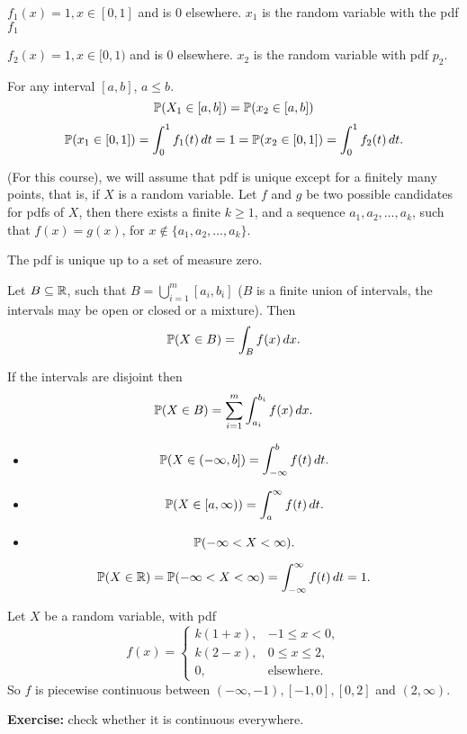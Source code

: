 \documentclass[10pt, a4paper]{article}
\begin{document}
\begin{example}
    $f_1(x) = 1, x \in [0, 1]$ and is $0$ elsewhere.
    $x_1$ is the random variable with the pdf $f_1$
    
    $f_2(x) = 1, x \in [0, 1)$ and is $0$ elsewhere.
    $x_2$ is the random variable with pdf $p_2$.

    For any interval $[a, b]$, $a \leq b$.
    \[
    \P(X_1 \in [a, b]) = \P(x_2 \in [a, b])
    \]
    \[
    \P(x_1 \in [0, 1]) = \int_0^1f_1(t)\,dt = 1 = \P(x_2 \in [0, 1]) = \int_0^1f_2(t)\,dt.
    \]

    (For this course),
    we will assume that pdf is unique except for a finitely many points,
    that is,
    if $X$ is a random variable.
    Let $f$ and $g$ be two possible candidates for pdfs of $X$,
    then there exists a finite $k \geq 1$,
    and a sequence $a_1, a_2, \dotsc, a_k$,
    such that $f(x) = g(x)$,
    for $x \notin \{a_1, a_2, \dotsc, a_k\}$.

    The pdf is unique up to a set of measure zero.
\end{example}

\begin{theorem}\label{prob_thm_622}
    Let $B \subseteq \R$,
    such that $\displaystyle B = \bigcup_{i = 1}^{m}[a_i, b_i]$
    ($B$ is a finite union of intervals,
    the intervals may be open or closed or a mixture).
    Then
    \[
    \P(X \in B) = \int_Bf(x)\,dx.
    \]
\end{theorem}

\begin{corollary}
    If the intervals are disjoint then
    \[
    \P(X \in B) = \sum_{i = 1}^{m}\int_{a_i}^{b_i}f(x)\,dx.
    \]
\end{corollary}

\begin{itemize}
    \item 
    \[
    \P(X \in (-\infty, b]) = \int_{-\infty}^bf(t)\,dt.
    \]
    \item 
    \[
    \P(X \in [a, \infty)) = \int_a^{\infty}f(t)\,dt.
    \]
    \item 
    \[
    \P(-\infty < X < \infty).
    \]
\end{itemize}

\begin{corollary}\label{prob_col_623}
    \[
    \P(X \in \R) = \P(-\infty < X < \infty) = \int_{-\infty}^{\infty}f(t)\,dt = 1.
    \]
\end{corollary}

\begin{example}
    Let $X$ be a random variable,
    with pdf
    \[
    f(x) = \begin{cases}
        k(1 + x), & -1 \leq x < 0, \\
        k(2 - x), & 0 \leq x \leq 2, \\
        0, & \text{elsewhere}.
    \end{cases}
    \]
    So $f$ is piecewise continuous between $(-\infty, -1), [-1, 0], [0, 2]$ and $(2, \infty)$.

    \textbf{Exercise: } check whether it is continuous everywhere.
\end{example}
\end{document}
